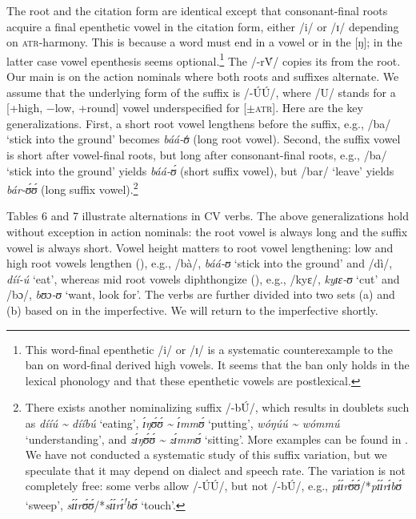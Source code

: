 \documentclass[output=paper
,newtxmath
,modfonts
,nonflat]{langsci/langscibook}
\begin{document}
\textup{The root and} \textup{the citation form are identical except that consonant-final roots acquire a final epenthetic vowel in the citation form, either /i/ or /ɪ/ depending on \textsc{atr}-harmony. This is because a  word must end in a vowel or in the  [ŋ]; in the latter case vowel epenthesis seems optional.}\footnote{This word-final epenthetic /i/ or /ɪ/ is a systematic counterexample to the ban on word-final derived high vowels. It seems that the ban only holds in the lexical phonology and that these epenthetic vowels are postlexical.} \textup{The  /-r\'{V}/ copies its  from the root. Our main  is on the action nominals where} \textup{both roots and suffixes alternate. We assume that the underlying form of the suffix is /-ÚÚ/}\textup{, where /U/ stands for a [+high, $-$low, +round] vowel underspecified for [$\pm$}\textsc{atr}\textup{]. Here are the key generalizations. First, a short root vowel lengthens before the suffix, e.g., /ba/ ‘stick into the ground’ becomes} \textit{báá-ʊ}́ \textup{(long root vowel). Second, the suffix vowel is short after vowel-final roots, but long after consonant-final roots, e.g., /ba/ ‘stick into the ground’ yields} \textit{báá-ʊ́} \textup{(short suffix vowel), but /bar/ ‘leave’ yields} \textit{bár-ʊ́ʊ́} \textup{(long suffix vowel).}\footnote{There exists another nominalizing suffix /-bÚ/, which results in doublets such as \textit{dííú {\textasciitilde} dííbú} ‘eating’, \textit{ɪ́ŋʊ́ʊ́ {\textasciitilde} ɪ́mmʊ́} ‘putting’, \textit{wóŋúú {\textasciitilde} wómmú} ‘understanding’, and \textit{zɪ́ŋʊ́ʊ́ {\textasciitilde} zɪ́mmʊ́} ‘sitting’. More examples can be found in \citet{Durand1953}. We have not conducted a systematic study of this suffix variation, but we speculate that it may depend on dialect and speech rate. The variation is not completely free: some verbs allow /-ÚÚ/, but not /-bÚ/, e.g., \textit{pɪ́ɪ́rʊ́ʊ́}/*\textit{pɪ́ɪ́rɪ́bʊ́} ‘sweep’, \textit{sɪ́ɪ́rʊ́ʊ́}/*\textit{sɪ́ɪ́rɪ́\textsuperscript{!}bʊ́} ‘touch’.}

{Tables 6 and 7 illustrate  alternations in CV verbs. The above generalizations hold without exception in action nominals: the root vowel is always long and the suffix vowel is always short. Vowel height matters to root vowel lengthening: low and high root vowels lengthen (), e.g., /bà/,} {\textit{báá-ʊ}}{ ‘stick into the ground’ and /dì/,} {\textit{díí-ú}}{ ‘eat’, whereas mid root vowels diphthongize (), e.g., /kyɛ/,} {\textit{kyɪɛ-ʊ}}{ ‘cut’ and /bɔ/,} {\textit{bʊɔ-ʊ}}{ ‘want, look for’. The verbs are further divided into two sets (a) and (b) based on  in the imperfective. We will return to the imperfective shortly.}
\end{document}
